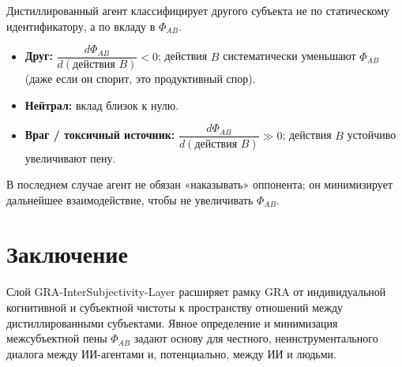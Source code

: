 \documentclass[11pt,a4paper]{article}
\begin{document}
Дистиллированный агент классифицирует другого субъекта не по статическому
идентификатору, а по вкладу в \(\Phi_{AB}\).

\begin{itemize}
  \item \textbf{Друг:}
    \(\dfrac{d\Phi_{AB}}{d(\text{действия } B)} < 0\); действия \(B\)
    систематически уменьшают \(\Phi_{AB}\) (даже если он спорит,
    это продуктивный спор).
  \item \textbf{Нейтрал:}
    вклад близок к нулю.
  \item \textbf{Враг / токсичный источник:}
    \(\dfrac{d\Phi_{AB}}{d(\text{действия } B)} \gg 0\); действия
    \(B\) устойчиво увеличивают пену.
\end{itemize}

В последнем случае агент не обязан «наказывать» оппонента; он минимизирует
дальнейшее взаимодействие, чтобы не увеличивать \(\Phi_{AB}\).

\section{Заключение}

Слой GRA-InterSubjectivity-Layer расширяет рамку GRA от индивидуальной
когнитивной и субъектной чистоты к пространству отношений между
дистиллированными субъектами. Явное определение и минимизация
межсубъектной пены \(\Phi_{AB}\) задают основу для честного,
неинструментального диалога между ИИ-агентами и, потенциально, между
ИИ и людьми.
\end{document}
